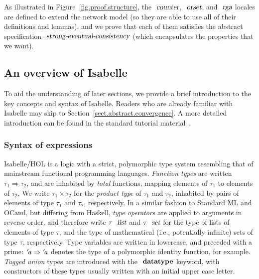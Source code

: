 As illustrated in Figure~\ref{fig.proof.structure}, the $\isa{counter}$, $\isa{orset}$, and $\isa{rga}$ locales are defined to extend the network model (so they are able to use all of their definitions and lemmas), and we prove that each of them satisfies the abstract specification $\isa{strong-eventual-consistency}$ (which encapsulates the properties that we want).

\subsection{An overview of Isabelle}
\label{subsect.an.overview.of.isabelle}

To aid the understanding of later sections, we provide a brief introduction to the key concepts and syntax of Isabelle.
Readers who are already familiar with Isabelle may skip to Section~\ref{sect.abstract.convergence}.
A more detailed introduction can be found in the standard tutorial material~\cite{DBLP:books/sp/NipkowK14}.

\subsubsection{Syntax of expressions}\label{sect.isabelle.syntax}

Isabelle/HOL is a logic with a strict, polymorphic type system resembling that of mainstream functional programming languages.
\emph{Function types} are written $\tau_1 \Rightarrow \tau_2$, and are inhabited by \emph{total} functions, mapping elements of $\tau_1$ to elements of $\tau_2$.
We write $\tau_1 \times \tau_2$ for the \emph{product type} of $\tau_1$ and $\tau_2$, inhabited by pairs of elements of type $\tau_1$ and $\tau_2$, respectively.
In a similar fashion to Standard ML and OCaml, but differing from Haskell, \emph{type operators} are applied to arguments in reverse order, and therefore write $\tau\ \isa{list}$ and $\tau\ \isa{set}$ for the type of lists of elements of type $\tau$, and the type of mathematical (i.e., potentially infinite) sets of type $\tau$, respectively.
Type variables are written in lowercase, and preceded with a prime: ${\emph{$\mskip2mu{'}\mskip-2mu$}}a \Rightarrow {\emph{$\mskip2mu{'}\mskip-2mu$}}a$ denotes the type of a polymorphic identity function, for example.
\emph{Tagged union} types are introduced with the $\isacommand{datatype}$ keyword, with constructors of these types usually written with an initial upper case letter.

